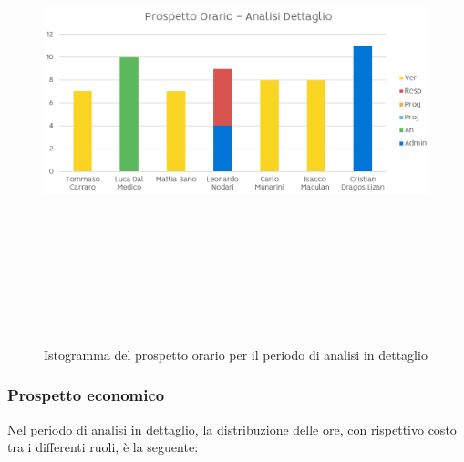             
                \begin{figure}[htbp]
                	\centering
                    \includegraphics[width=14cm,height=14cm,keepaspectratio]{./img/ProspettoOrario/POAnalisiDettaglio.png}
                    \caption[Analisi dettaglio - Istogramma prospetto orario]{Istogramma del prospetto orario per il periodo di analisi in dettaglio}
                \end{figure}
            

        \subsubsection{Prospetto economico}

            Nel periodo di analisi in dettaglio, la distribuzione delle ore, con rispettivo costo tra i differenti ruoli,
            è la seguente:

